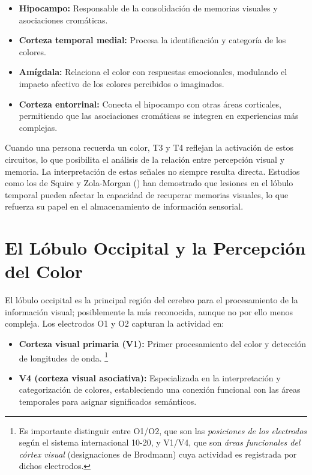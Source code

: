 \begin{itemize}
    \item \textbf{Hipocampo:} Responsable de la consolidación de memorias visuales y asociaciones cromáticas.
    \item \textbf{Corteza temporal medial:} Procesa la identificación y categoría de los colores.
    \item \textbf{Amígdala:} Relaciona el color con respuestas emocionales, modulando el impacto afectivo de los colores percibidos o imaginados.
    \item \textbf{Corteza entorrinal:} Conecta el hipocampo con otras áreas corticales, permitiendo que las asociaciones cromáticas se integren en experiencias más complejas.
\end{itemize}

Cuando una persona recuerda un color, T3 y T4 reflejan la activación de estos circuitos, lo que posibilita el análisis de la relación entre percepción visual y memoria. La interpretación de estas señales no siempre resulta directa. Estudios como los de Squire y Zola-Morgan (\citeyear{Squire_Zola_Morgan_1991}) han demostrado que lesiones en el lóbulo temporal pueden afectar la capacidad de recuperar memorias visuales, lo que refuerza su papel en el almacenamiento de información sensorial.

\section{El Lóbulo Occipital y la Percepción del Color}

El lóbulo occipital es la principal región del cerebro para el procesamiento de la información visual; posiblemente la más reconocida, aunque no por ello menos compleja. Los electrodos O1 y O2 capturan la actividad en:

\begin{itemize}
    \item \textbf{Corteza visual primaria (V1):} Primer procesamiento del color y detección de longitudes de onda. \footnote{Es importante distinguir entre O1/O2, que son las \textit{posiciones de los electrodos} según el sistema internacional 10-20, y V1/V4, que son \textit{áreas funcionales del córtex visual} (designaciones de Brodmann) cuya actividad es registrada por dichos electrodos.}
    
    \item \textbf{V4 (corteza visual asociativa):} Especializada en la interpretación y categorización de colores, estableciendo una conexión funcional con las áreas temporales para asignar significados semánticos.
\end{itemize}

